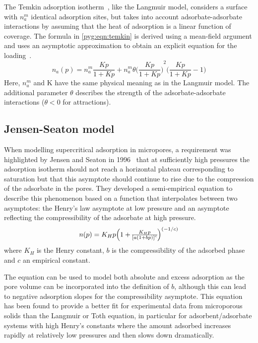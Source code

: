 The Temkin adsorption
isotherm~\cite{temkinKineticsAmmoniaSynthesis1940},
like the Langmuir model, considers
a surface with \(n_a^m\) identical adsorption sites, but takes into
account adsorbate-adsorbate interactions by assuming that the
heat of adsorption is a linear function of  coverage.
The formula in \autoref{pyg:eqn:temkin} is derived
using a mean-field argument and uses an asymptotic approximation
to obtain an explicit equation for the
loading~\cite{simonOptimizingNanoporousMaterials2014}.
%
\begin{equation}\label{pyg:eqn:temkin}
	n_a(p) = n_a^m \frac{Kp}{1+Kp} + n_a^m \theta
	{\Big(\frac{Kp}{1+Kp}\Big)}^2 \Big(\frac{Kp}{1+Kp} -1\Big)
\end{equation}
%
Here, \(n_a^m\) and K have the same physical meaning as in the
Langmuir model.
The additional parameter \( \theta \) describes the strength of the
adsorbate-adsorbate
interactions (\(\theta < 0\) for attractions).

\subsection{Jensen-Seaton model}\label{pyg:models:jseaton}

When modelling supercritical adsorption in micropores, a requirement was
highlighted by
Jensen and Seaton in 1996~\cite{jensenIsothermEquationAdsorption1996}
that at sufficiently high pressures the adsorption
isotherm should not reach a horizontal plateau corresponding to
saturation but that this asymptote should continue to rise due to
the compression of the adsorbate in the pores. They developed a
semi-empirical equation to describe this phenomenon based on a function
that interpolates between two asymptotes: the Henry’s law asymptote at
low pressure and an asymptote reflecting the compressibility of
the adsorbate at high pressure.
%
\begin{equation}\label{pyg:eqn:jseaton}
	n(p) = K_H p \Big{(1 + \frac{K_H p}{{[a {(1 + b
									p)}]}^c}\Big)}^{(-1/c)}
\end{equation}
%
where \(K_H\) is the Henry constant, \(b\) is the compressibility of
the adsorbed phase and \(c\) an empirical constant.

The equation can be used to model both absolute and excess adsorption
as the pore volume can be incorporated into the definition of \(b\),
although this can lead to negative adsorption slopes for the
compressibility asymptote. This equation has been found to provide a
better fit for experimental data from microporous solids than the
Langmuir or Toth equation, in particular for
adsorbent/adsorbate systems with high Henry’s constants where the
amount adsorbed increases rapidly at relatively low pressures and
then slows down dramatically.

